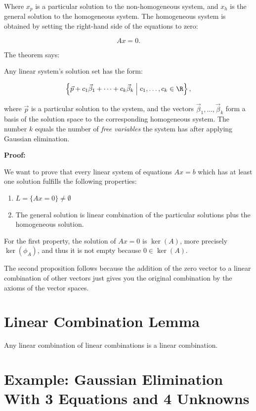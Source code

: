 Where \( x_p \) is a particular solution to the non-homogeneous system, and \( x_h \) is the general
solution to the homogeneous system. The homogeneous system is obtained by setting the right-hand side
of the equations to zero:

\[
    A x = 0.
\]

The theorem says:

Any linear system's solution set has the form:

\[
    \left\{ \vec{p} + c_1\vec{\beta}_1 + \cdots + c_k\vec{\beta}_k \;\middle|\; c_1, \ldots, c_k \in
    \R \right\},
\]

where \(\vec{p}\) is a particular solution to the system, and the vectors \(\vec{\beta}_1,
\ldots, \vec{\beta}_k\) form a basis of the solution space to the corresponding homogeneous system.
The number \(k\) equals the number of \emph{free variables} the system has after applying Gaussian
elimination.

\textbf{Proof:}

We want to prove that every linear system of equations \(Ax = b\) which has at least one solution fulfills 
the following properties:

\begin{enumerate}

    \item \(L = \{Ax = 0\} \ne \emptyset\)

    \item The general solution is linear combination of the particular solutions plus the homogeneous solution.

\end{enumerate}

For the first property, the solution of \(Ax = 0\) is \(\ker(A)\), more precisely \(\ker(\phi_A)\), and thus 
it is not empty because \(0 \in \ker(A)\).

The second proposition follows because the addition of the zero vector to a linear 
combination of other vectors just gives you the original combination by the axioms of the vector spaces.

\QED 

\section{Linear Combination Lemma}

Any linear combination of linear combinations is a linear combination.

\section{Example: Gaussian Elimination With 3 Equations and 4 Unknowns}

